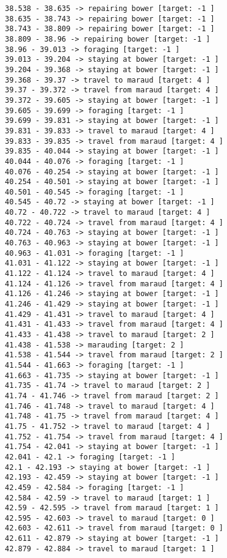 \documentclass[11pt]{article}
\begin{document}
\begin{Verbatim}[commandchars=\\\{\}]
38.538 - 38.635 -> repairing bower [target: -1 ]
38.635 - 38.743 -> repairing bower [target: -1 ]
38.743 - 38.809 -> repairing bower [target: -1 ]
38.809 - 38.96 -> repairing bower [target: -1 ]
38.96 - 39.013 -> foraging [target: -1 ]
39.013 - 39.204 -> staying at bower [target: -1 ]
39.204 - 39.368 -> staying at bower [target: -1 ]
39.368 - 39.37 -> travel to maraud [target: 4 ]
39.37 - 39.372 -> travel from maraud [target: 4 ]
39.372 - 39.605 -> staying at bower [target: -1 ]
39.605 - 39.699 -> foraging [target: -1 ]
39.699 - 39.831 -> staying at bower [target: -1 ]
39.831 - 39.833 -> travel to maraud [target: 4 ]
39.833 - 39.835 -> travel from maraud [target: 4 ]
39.835 - 40.044 -> staying at bower [target: -1 ]
40.044 - 40.076 -> foraging [target: -1 ]
40.076 - 40.254 -> staying at bower [target: -1 ]
40.254 - 40.501 -> staying at bower [target: -1 ]
40.501 - 40.545 -> foraging [target: -1 ]
40.545 - 40.72 -> staying at bower [target: -1 ]
40.72 - 40.722 -> travel to maraud [target: 4 ]
40.722 - 40.724 -> travel from maraud [target: 4 ]
40.724 - 40.763 -> staying at bower [target: -1 ]
40.763 - 40.963 -> staying at bower [target: -1 ]
40.963 - 41.031 -> foraging [target: -1 ]
41.031 - 41.122 -> staying at bower [target: -1 ]
41.122 - 41.124 -> travel to maraud [target: 4 ]
41.124 - 41.126 -> travel from maraud [target: 4 ]
41.126 - 41.246 -> staying at bower [target: -1 ]
41.246 - 41.429 -> staying at bower [target: -1 ]
41.429 - 41.431 -> travel to maraud [target: 4 ]
41.431 - 41.433 -> travel from maraud [target: 4 ]
41.433 - 41.438 -> travel to maraud [target: 2 ]
41.438 - 41.538 -> marauding [target: 2 ]
41.538 - 41.544 -> travel from maraud [target: 2 ]
41.544 - 41.663 -> foraging [target: -1 ]
41.663 - 41.735 -> staying at bower [target: -1 ]
41.735 - 41.74 -> travel to maraud [target: 2 ]
41.74 - 41.746 -> travel from maraud [target: 2 ]
41.746 - 41.748 -> travel to maraud [target: 4 ]
41.748 - 41.75 -> travel from maraud [target: 4 ]
41.75 - 41.752 -> travel to maraud [target: 4 ]
41.752 - 41.754 -> travel from maraud [target: 4 ]
41.754 - 42.041 -> staying at bower [target: -1 ]
42.041 - 42.1 -> foraging [target: -1 ]
42.1 - 42.193 -> staying at bower [target: -1 ]
42.193 - 42.459 -> staying at bower [target: -1 ]
42.459 - 42.584 -> foraging [target: -1 ]
42.584 - 42.59 -> travel to maraud [target: 1 ]
42.59 - 42.595 -> travel from maraud [target: 1 ]
42.595 - 42.603 -> travel to maraud [target: 0 ]
42.603 - 42.611 -> travel from maraud [target: 0 ]
42.611 - 42.879 -> staying at bower [target: -1 ]
42.879 - 42.884 -> travel to maraud [target: 1 ]

\end{Verbatim}
\end{document}
